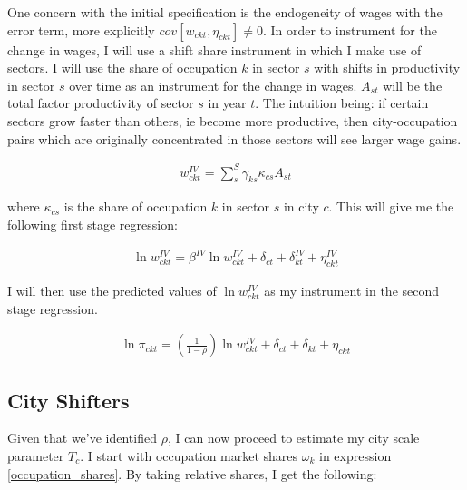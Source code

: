 \documentclass[10pt]{article}
\begin{document}

One concern with the initial specification is the endogeneity of wages with the error term, more explicitly $cov[w_{ckt}, \eta_{ckt}] \neq 0$. In order to instrument for the change in wages, I will use a shift share instrument in which I make use of sectors. I will use the share of occupation $k$ in sector $s$ with shifts in productivity in sector $s$ over time as an instrument for the change in wages. $A_{st}$ will be the total factor productivity of sector $s$ in year $t$. The intuition being: if certain sectors grow faster than others, ie become more productive, then city-occupation pairs which are originally concentrated in those sectors will see larger wage gains.


\begin{align*}
    w_{ckt}^{IV} = \sum_{s}^{S} \gamma_{ks} \kappa_{cs} A_{st}
\end{align*}

where $\kappa_{cs}$ is the  share of occupation $k$ in sector $s$ in city $c$. This will give me the following first stage regression:

\begin{align*}
    \ln w_{ckt}^{IV} = \beta^{IV} \ln w_{ckt}^{IV} + \delta_{ct} + \delta_{kt}^{IV} + \eta_{ckt}^{IV}
\end{align*}

I will then use the predicted values of $\ln w_{ckt}^{IV}$ as my instrument in the second stage regression.

\begin{align*}
    \ln \pi_{ckt} = \left( \frac{1}{1 - \rho} \right) \ln w_{ckt}^{IV} + \delta_{ct} + \delta_{kt} + \eta_{ckt}
\end{align*}

\subsection{City Shifters}

Given that we've identified $\rho$, I can now proceed to estimate my city scale parameter $T_c$. I start with occupation market shares $\omega_k$ in expression \ref{occupation_shares}. By taking relative shares, I get the following:
\end{document}
